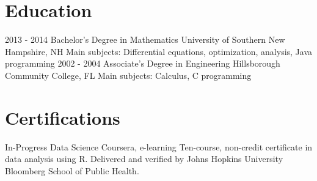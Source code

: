 \documentclass[]{friggeri-cv}
\begin{document}
\section{Education}
\begin{entrylist}
  \entry
    {2013 - 2014}
    {Bachelor's Degree in Mathematics}
    {University of Southern New Hampshire, NH}
    {Main subjects: Differential equations, optimization, analysis, Java programming}
  \entry
    {2002 - 2004}
    {Associate's Degree in Engineering}
    {Hillsborough Community College, FL}
    {Main subjects: Calculus, C programming}
\end{entrylist}

\section{Certifications}
\begin{entrylist}
  \entry
    {In-Progress}
    {Data Science}
    {Coursera, e-learning}
    {Ten-course, non-credit certificate in data analysis using R.  Delivered and verified by Johns Hopkins University Bloomberg School of Public Health.}
\end{entrylist}
\end{document}
